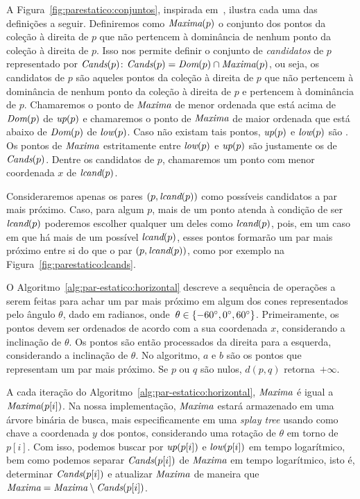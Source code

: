 A Figura~\ref{fig:parestatico:conjuntos}, inspirada em~\cite{BASCH19991}, ilustra cada uma das
definições a seguir.
Definiremos como $\textit{Maxima}(p)$ o conjunto dos pontos da coleção à direita de $p$ que não pertencem à
dominância de nenhum ponto da coleção à direita de $p$.
Isso nos permite definir o conjunto de \textit{candidatos} de $p$ representado por $\textit{Cands}(p)$:
$\textit{Cands}(p) = \textit{Dom}(p) \cap\textit{Maxima}(p)$, ou seja, os candidatos de $p$ são aqueles pontos da coleção à
direita de $p$ que não pertencem à dominância de nenhum ponto da coleção à direita de $p$ e
pertencem à dominância de $p$.
Chamaremos o ponto de $\textit{Maxima}$ de menor ordenada que está acima de $\textit{Dom}(p)$ de $\textit{up}(p)$ e
chamaremos o ponto de $\textit{Maxima}$ de maior ordenada que está abaixo de $\textit{Dom}(p)$ de $\textit{low}(p)$.
Caso não existam tais pontos, $\textit{up}(p)$ e $\textit{low}(p)$ são \nnull.
Os pontos de $\textit{Maxima}$ estritamente entre $\textit{low}(p)$ e $\textit{up}(p)$ são justamente os de $\textit{Cands}(p)$.
Dentre os candidatos de $p$, chamaremos um ponto com menor coordenada $x$ de $\textit{lcand}(p)$.



Consideraremos apenas os pares $(p, \textit{lcand}(p))$ como possíveis candidatos a par mais próximo.
Caso, para algum $p$, mais de um ponto atenda à condição de ser $\textit{lcand}(p)$ poderemos escolher
qualquer um deles como $\textit{lcand}(p)$, pois, em um caso em que há mais de um possível $\textit{lcand}(p)$,
esses pontos formarão um par mais próximo entre si do que o par $(p, \textit{lcand}(p))$, como por exemplo
na Figura~\ref{fig:parestatico:lcands}.



O Algoritmo~\ref{alg:par-estatico:horizontal} descreve a sequência de operações a serem feitas para
achar um par mais próximo em algum dos cones representados pelo ângulo $\theta$, dado em radianos,
onde~$\theta \in \left\{ -60^\circ, 0^\circ, 60^\circ \right\}$.
Primeiramente, os pontos devem ser ordenados de acordo com a sua coordenada $x$, considerando a
inclinação de $\theta$.
Os pontos são então processados da direita para a esquerda, considerando a inclinação de $\theta$.
No algoritmo, $a$ e $b$ são os pontos que representam um par mais próximo.
Se $p$ ou $q$ são nulos, $d(p,q)$ retorna~$+\infty$.

A cada iteração do Algoritmo~\ref{alg:par-estatico:horizontal}, $\textit{Maxima}$ é igual a
$\textit{Maxima}(p[i])$.
Na nossa implementação, $\textit{Maxima}$ estará armazenado em uma árvore binária de busca, mais
especificamente em uma \textit{splay tree} usando como chave a coordenada $y$ dos pontos,
considerando uma rotação de $\theta$ em torno de $p[i]$.
Com isso, podemos buscar por $\textit{up}(p[i])$ e $\textit{low}(p[i])$ em tempo logarítmico, bem como podemos
separar $\textit{Cands}(p[i])$ de $\textit{Maxima}$ em tempo logarítmico, isto é, determinar $\textit{Cands}(p[i])$ e
atualizar $\textit{Maxima}$ de maneira que $\textit{Maxima} = \textit{Maxima} \setminus \textit{Cands}(p[i])$.

